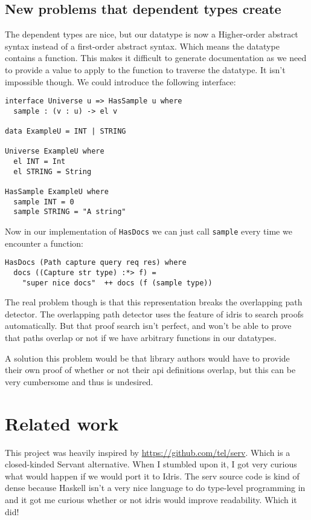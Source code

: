 \documentclass[12pt,a4paper]{article}
\begin{document}
\subsection{New problems that dependent types create}
The dependent types are nice, but our datatype is now a Higher-order abstract syntax instead of a first-order abstract syntax.
Which means the datatype contains a function.  This makes it difficult to generate documentation as we need to provide a value
to apply to the function to traverse the datatype. It isn't impossible though. We could introduce the following interface:
\begin{verbatim}
interface Universe u => HasSample u where
  sample : (v : u) -> el v

data ExampleU = INT | STRING

Universe ExampleU where
  el INT = Int
  el STRING = String

HasSample ExampleU where
  sample INT = 0
  sample STRING = "A string"
\end{verbatim}
Now in our implementation of \texttt{HasDocs} we can just call \texttt{sample}
every time we encounter a function:
\begin{verbatim}
HasDocs (Path capture query req res) where
  docs ((Capture str type) :*> f) =
    "super nice docs"  ++ docs (f (sample type))
\end{verbatim}

The real problem though is that this representation breaks the overlapping path detector.
The overlapping path detector uses the feature of idris to search proofs automatically. But that
proof search isn't perfect, and won't be able to prove that paths overlap or not if we have
arbitrary functions in our datatypes.

A solution this problem would be that library authors would have to provide their own proof
of whether or not their api definitions overlap, but this can be very cumbersome and thus
is undesired.

\section{Related work}
This project was heavily inspired by \url{https://github.com/tel/serv}. Which is
a closed-kinded Servant alternative. When I stumbled upon it, I got very curious
what would happen if we would port it to Idris.  The serv source code is kind of
dense because Haskell isn't a very nice language to do type-level programming in
and it got me curious whether or not idris would improve readability. Which it did!
\end{document}
